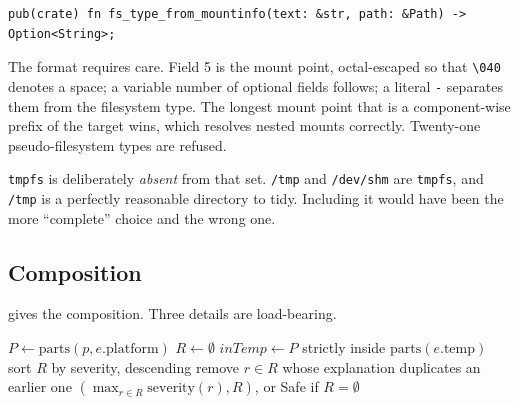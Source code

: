 \documentclass[11pt,a4paper]{article}
\newcommand{\code}[1]{\texttt{\small #1}}
\begin{document}
\begin{lstlisting}
pub(crate) fn fs_type_from_mountinfo(text: &str, path: &Path) -> Option<String>;
\end{lstlisting}

The format requires care. Field 5 is the mount point, octal-escaped so that
\code{\textbackslash 040} denotes a space; a variable number of optional fields follows; a literal
\code{-} separates them from the filesystem type. The longest mount point that is a
component-wise prefix of the target wins, which resolves nested mounts correctly.
Twenty-one pseudo-filesystem types are refused.

\code{tmpfs} is deliberately \emph{absent} from that set. \code{/tmp} and
\code{/dev/shm} are \code{tmpfs}, and \code{/tmp} is a perfectly reasonable directory
to tidy. Including it would have been the more \enquote{complete} choice and the
wrong one.

\subsection{Composition}

 gives the composition. Three details are load-bearing.

\begin{algorithm}[t]
\SetAlgoLined
\DontPrintSemicolon
{}
$P \leftarrow \mathrm{parts}(p, e.\mathrm{platform})$\;
$R \leftarrow \emptyset$\;
$\mathit{inTemp} \leftarrow P$ strictly inside $\mathrm{parts}(e.\mathrm{temp})$\;
sort $R$ by severity, descending\;
remove $r \in R$ whose explanation duplicates an earlier one\;
\Return $(\max_{r \in R} \mathrm{severity}(r), R)$, or \textsf{Safe} if $R = \emptyset$\;
\caption{\textsc{Classify}}
\label{alg:classify}
\end{algorithm}
\end{document}
